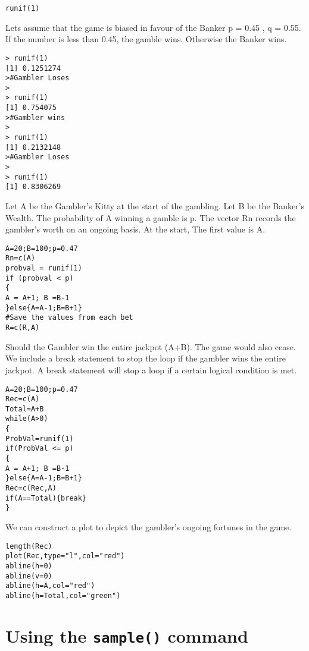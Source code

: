 \begin{verbatim}
runif(1)
\end{verbatim}

Lets assume that the game is biased in favour of the Banker p = 0.45 , q = 0.55. If the
number is less than 0.45, the gamble wins. Otherwise the Banker wins.
\begin{verbatim}
> runif(1)
[1] 0.1251274
>#Gambler Loses
>
> runif(1)
[1] 0.754075
>#Gambler wins
>
> runif(1)
[1] 0.2132148
>#Gambler Loses
>
> runif(1)
[1] 0.8306269
\end{verbatim}

Let A be the Gambler's Kitty at the start of the gambling. Let B be the Banker's Wealth.
The probability of A winning a gamble is p. The vector Rn records the gambler's worth on an
ongoing basis. At the start, The first value is A.

\begin{verbatim}
A=20;B=100;p=0.47
Rn=c(A)
probval = runif(1)
if (probval < p)
{
A = A+1; B =B-1
}else{A=A-1;B=B+1}
#Save the values from each bet
R=c(R,A)
\end{verbatim}



Should the Gambler win the entire jackpot (A+B). The game would also cease. We include
a break statement to stop the loop if the gambler wins the entire jackpot. A break statement
will stop a loop if a certain logical condition is met.

\begin{verbatim}
A=20;B=100;p=0.47
Rec=c(A)
Total=A+B
while(A>0)
{
ProbVal=runif(1)
if(ProbVal <= p)
{
A = A+1; B =B-1
}else{A=A-1;B=B+1}
Rec=c(Rec,A)
if(A==Total){break}
}
\end{verbatim}


We can construct a plot to depict the gambler's ongoing fortunes in the game.

\begin{verbatim}
length(Rec)
plot(Rec,type="l",col="red")
abline(h=0)
abline(v=0)
abline(h=A,col="red")
abline(h=Total,col="green")
\end{verbatim}



\section{Using the \texttt{sample()} command}
\large

